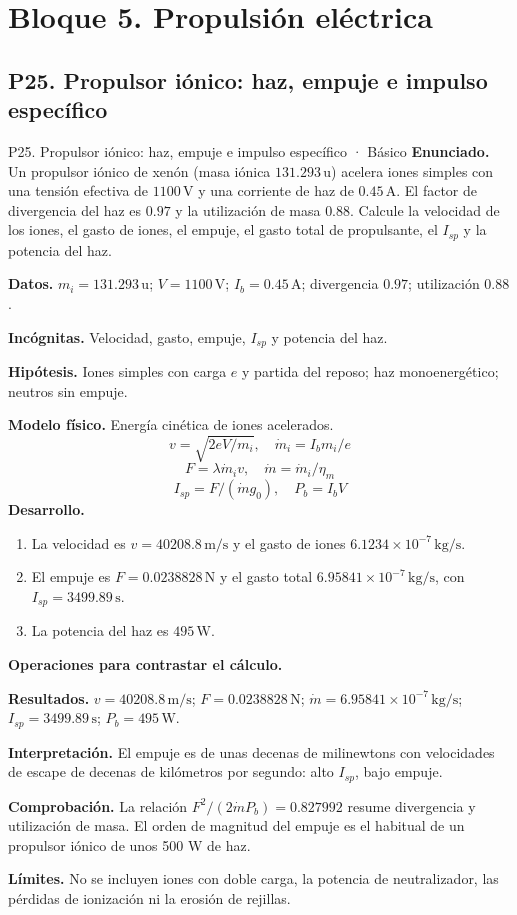 \chapter{Bloque 5. Propulsión eléctrica}
\section{P25. Propulsor iónico: haz, empuje e impulso específico}
\begin{studiumworked}{P25. Propulsor iónico: haz, empuje e impulso específico · Básico}
\textbf{Enunciado.} Un propulsor iónico de xenón (masa iónica $131.293\,\mathrm u$) acelera iones simples con una tensión efectiva de $1100\,\mathrm V$ y una corriente de haz de $0.45\,\mathrm A$. El factor de divergencia del haz es $0.97$ y la utilización de masa $0.88$. Calcule la velocidad de los iones, el gasto de iones, el empuje, el gasto total de propulsante, el $I_{sp}$ y la potencia del haz.

\textbf{Datos.} $m_i=131.293\,\mathrm u$; $V=1100\,\mathrm V$; $I_b=0.45\,\mathrm A$; divergencia $0.97$; utilización $0.88$.

\textbf{Incógnitas.} Velocidad, gasto, empuje, $I_{sp}$ y potencia del haz.

\textbf{Hipótesis.} Iones simples con carga $e$ y partida del reposo; haz monoenergético; neutros sin empuje.

\textbf{Modelo físico.} Energía cinética de iones acelerados.
\[v=\sqrt{2eV/m_i},\quad \dot m_i=I_bm_i/e\]
\[F=\lambda\dot m_iv,\quad \dot m=\dot m_i/\eta_m\]
\[I_{sp}=F/(\dot mg_0),\quad P_b=I_bV\]
\textbf{Desarrollo.}
\begin{enumerate}
\item La velocidad es $v=40208.8\,\mathrm{m/s}$ y el gasto de iones $6.1234\times10^{-7}\,\mathrm{kg/s}$.
\item El empuje es $F=0.0238828\,\mathrm N$ y el gasto total $6.95841\times10^{-7}\,\mathrm{kg/s}$, con $I_{sp}=3499.89\,\mathrm s$.
\item La potencia del haz es $495\,\mathrm W$.
\end{enumerate}
\textbf{Operaciones para contrastar el cálculo.}

\textbf{Resultados.} $v=40208.8\,\mathrm{m/s}$; $F=0.0238828\,\mathrm N$; $\dot m=6.95841\times10^{-7}\,\mathrm{kg/s}$; $I_{sp}=3499.89\,\mathrm s$; $P_b=495\,\mathrm W$.

\textbf{Interpretación.} El empuje es de unas decenas de milinewtons con velocidades de escape de decenas de kilómetros por segundo: alto $I_{sp}$, bajo empuje.

\textbf{Comprobación.} La relación $F^2/(2\dot mP_b)=0.827992$ resume divergencia y utilización de masa. El orden de magnitud del empuje es el habitual de un propulsor iónico de unos 500 W de haz.

\textbf{Límites.} No se incluyen iones con doble carga, la potencia de neutralizador, las pérdidas de ionización ni la erosión de rejillas.
\end{studiumworked}
